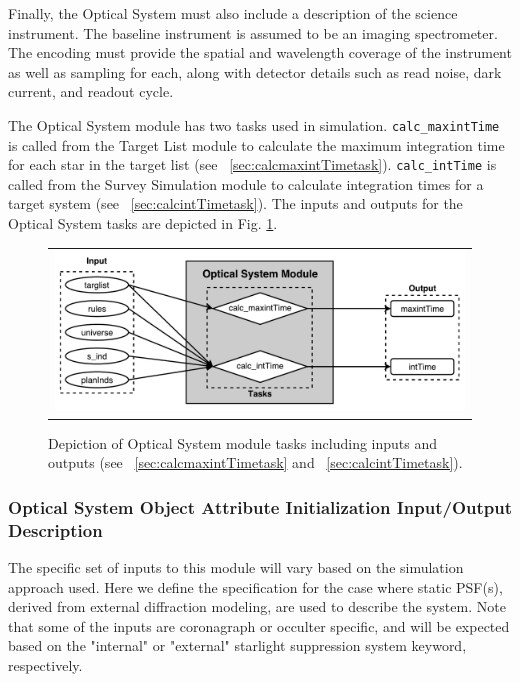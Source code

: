 \documentclass[cleanfoot]{asme2ej}
\begin{document}
Finally, the Optical System must also include a description of the science instrument.  The baseline instrument is assumed to be an imaging spectrometer.  The encoding must provide the spatial and wavelength coverage of the instrument as well as sampling for each, along with detector details such as read noise, dark current, and readout cycle.

The Optical System module has two tasks used in simulation.  \verb+calc_maxintTime+ is called from the Target List module to calculate the maximum integration time for each star in the target list (see ~\ref{sec:calcmaxintTimetask}).  \verb+calc_intTime+ is called from the Survey Simulation module to calculate integration times for a target system (see ~\ref{sec:calcintTimetask}).  The inputs and outputs for the Optical System tasks are depicted in Fig. \ref{fig:opticalsysmodule}.

\begin{figure}[ht]
    \begin{center}
        \begin{tabular}{c}
             \includegraphics[width=\textwidth]{OpticalSysTasks}
        \end{tabular}
    \end{center}
    \caption{\label{fig:opticalsysmodule} Depiction of Optical System module tasks including inputs and outputs (see ~\ref{sec:calcmaxintTimetask} and ~\ref{sec:calcintTimetask}).}
\end{figure}


\label{sec:opticalsystem}
\subsubsection{Optical System Object Attribute Initialization Input/Output Description} 

The specific set of inputs to this module will vary based on the simulation approach used.  Here we define the specification for the case where static PSF(s), derived from external diffraction modeling, are used to describe the system.  Note that some of the inputs are coronagraph or occulter specific, and will be expected based on the "internal" or "external" starlight suppression system keyword, respectively.
\end{document}
